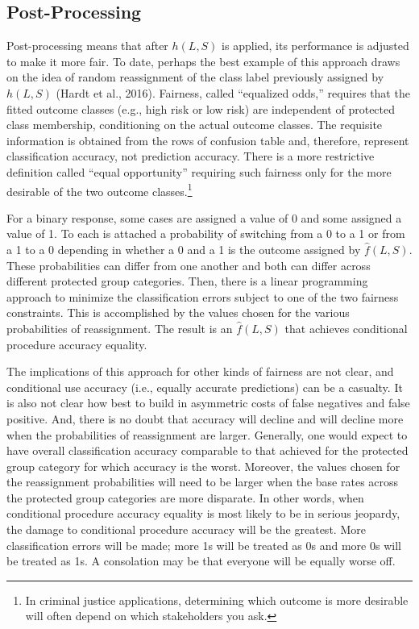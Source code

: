 \documentclass[12pt]{article}
\begin{document}
\subsection{Post-Processing} 

Post-processing means that after $h(L,S)$ is applied, its performance is adjusted to make it more fair. To date, perhaps the best example of this approach draws on the idea of random reassignment of the class label previously assigned by $h(L,S)$ (Hardt et al., 2016). Fairness, called ``equalized odds,'' requires that the fitted outcome classes (e.g., high risk or low risk) are independent of protected class membership, conditioning on the actual outcome classes. The requisite information is obtained from the rows of confusion table and, therefore, represent classification accuracy, not prediction accuracy. There is a more restrictive definition called ``equal opportunity''  requiring such fairness only for the more desirable of the two outcome classes.\footnote
{
In criminal justice applications, determining which outcome is more desirable will often depend on which stakeholders you ask. 
}
 
For a binary response, some cases are assigned a value of 0 and some assigned a value of 1. To each is attached a probability of switching from a 0 to a 1 or from a 1 to a 0 depending in whether a 0 and a 1 is the outcome assigned by $\hat{f}(L,S)$. These probabilities can differ from one another and both can differ across different protected group categories. Then, there is a linear programming approach to minimize the classification errors subject to one of the two fairness constraints. This is accomplished by the values chosen for the various probabilities of reassignment.  The result is an $\hat{f}(L,S)$ that achieves conditional procedure accuracy equality.

The implications of this approach for other kinds of fairness are not clear, and conditional use accuracy (i.e., equally accurate predictions) can be a casualty. It is also not clear how best to build in asymmetric costs of false negatives and false positive. And, there is no doubt that accuracy will decline and will decline more when the probabilities of reassignment are larger. Generally, one would expect to have overall classification accuracy comparable to that achieved for the protected group category for which accuracy is the worst. Moreover, the values chosen for the reassignment probabilities will need to be larger when the base rates across the protected group categories are more disparate. In other words, when conditional procedure accuracy equality is most likely to be in serious jeopardy, the damage to conditional procedure accuracy will be the greatest. More classification errors will be made; more 1s will be treated as 0s and more 0s will be treated as 1s. A consolation may be that everyone will be equally worse off. 
\end{document}

